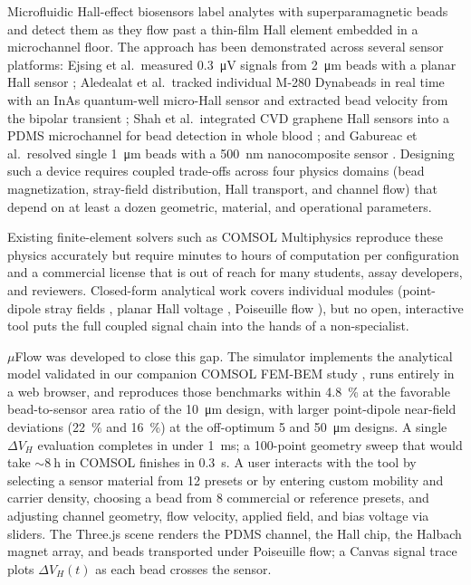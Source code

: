 \documentclass[preprint,12pt,a4paper]{elsarticle}
\begin{document}
Microfluidic Hall-effect biosensors label analytes with superparamagnetic beads and detect them as they flow past a thin-film Hall element embedded in a microchannel floor. The approach has been demonstrated across several sensor platforms: Ejsing et al.\ measured \SI{0.3}{\micro\volt} signals from \SI{2}{\micro\meter} beads with a planar Hall sensor \cite{ejsing2004}; Aledealat et al.\ tracked individual M-280 Dynabeads in real time with an InAs quantum-well micro-Hall sensor and extracted bead velocity from the bipolar transient \cite{aledealat2009}; Shah et al.\ integrated CVD graphene Hall sensors into a PDMS microchannel for bead detection in whole blood \cite{shah2023}; and Gabureac et al.\ resolved single \SI{1}{\micro\meter} beads with a \SI{500}{\nano\meter} nanocomposite sensor \cite{gabureac2013}. Designing such a device requires coupled trade-offs across four physics domains (bead magnetization, stray-field distribution, Hall transport, and channel flow) that depend on at least a dozen geometric, material, and operational parameters.

Existing finite-element solvers such as COMSOL Multiphysics reproduce these physics accurately but require minutes to hours of computation per configuration and a commercial license that is out of reach for many students, assay developers, and reviewers. Closed-form analytical work covers individual modules (point-dipole stray fields \cite{griffiths,jenkins2019}, planar Hall voltage \cite{popovic2004}, Poiseuille flow \cite{hewlin2023}), but no open, interactive tool puts the full coupled signal chain into the hands of a non-specialist.

$\mu$Flow was developed to close this gap. The simulator implements the analytical model validated in our companion COMSOL FEM-BEM study \cite{govindaraju2025}, runs entirely in a web browser, and reproduces those benchmarks within \SI{4.8}{\percent} at the favorable bead-to-sensor area ratio of the \SI{10}{\micro\meter} design, with larger point-dipole near-field deviations (\SI{22}{\percent} and \SI{16}{\percent}) at the off-optimum \SI{5}{} and \SI{50}{\micro\meter} designs. A single $\Delta V_H$ evaluation completes in under \SI{1}{\milli\second}; a 100-point geometry sweep that would take ${\sim}\SI{8}{\hour}$ in COMSOL finishes in \SI{0.3}{\second}. A user interacts with the tool by selecting a sensor material from 12 presets or by entering custom mobility and carrier density, choosing a bead from 8 commercial or reference presets, and adjusting channel geometry, flow velocity, applied field, and bias voltage via sliders. The Three.js scene renders the PDMS channel, the Hall chip, the Halbach magnet array, and beads transported under Poiseuille flow; a Canvas signal trace plots $\Delta V_H(t)$ as each bead crosses the sensor.
\end{document}
